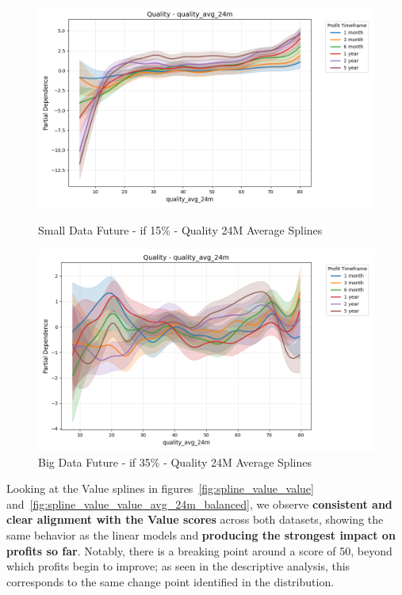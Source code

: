 \documentclass[11pt,english,a4paper,hidelinks]{book}
\begin{document}
\begin{figure}[H]
    \centering
    \begin{minipage}{0.48\textwidth}
        \centering
        \includegraphics[width=\textwidth]{images/code/models/general_regression/splines/2D/Small Data future - IF/quality_quality_avg_24m.png}
        \caption{Small Data Future - \acrshort{if} 15\% - Quality 24M Average Splines}
        \label{fig:spline_quality_quality_avg_24m}
    \end{minipage}\hfill
    \begin{minipage}{0.48\textwidth}
        \centering
        \includegraphics[width=\textwidth]{images/code/models/general_regression/splines/2D/Big Data future - IF HARD Balanced/quality_quality_avg_24m.png}
        \caption{Big Data Future - \acrshort{if} 35\% - Quality 24M Average Splines}
        \label{fig:spline_quality_quality_avg_24m_balanced}
    \end{minipage}
\end{figure}

\noindent Looking at the Value splines in figures~\ref{fig:spline_value_value} and~\ref{fig:spline_value_value_avg_24m_balanced}, we observe \textbf{consistent and clear alignment with the Value scores} across both datasets, showing the same behavior as the linear models and \textbf{producing the strongest impact on profits so far}. Notably, there is a breaking point around a score of 50, beyond which profits begin to improve; as seen in the descriptive analysis, this corresponds to the same change point identified in the distribution.
\end{document}
